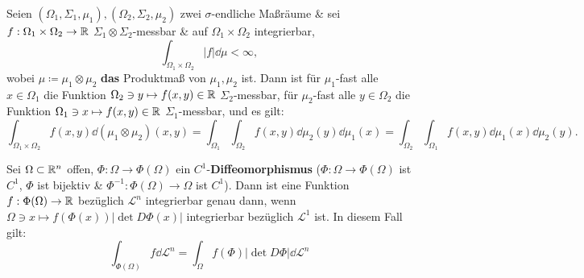 \begin{theorem}[Fubini]
	Seien $ \left( \Omega_1, \Sigma_1, \mu_1 \right) , \left( \Omega_2, \Sigma_2, \mu_2 \right)  $ zwei $ \sigma $-endliche Maßräume \& sei $ f: \Omega_1 \times \Omega_2 \to \mathbb{R}  $ $ \Sigma_1 \otimes \Sigma_2 $-messbar \& auf $ \Omega_1 \times \Omega_2 $ integrierbar,
	\[
		\int _{\Omega_1 \times \Omega_2} \left| f \right| \dd \mu < \infty,
	\]
	wobei $ \mu \coloneqq \mu_1 \otimes \mu_2 $ \textbf{das} Produktmaß von $ \mu_1, \mu_2 $ ist.
	Dann ist für $ \mu_1 $-fast alle $ x \in \Omega_1 $ die Funktion $ \Omega_2 \ni y \mapsto f(x, y) \in \mathbb{R}  $ $ \Sigma_2 $-messbar, für $ \mu_2 $-fast alle $ y \in \Omega_2 $ die Funktion $ \Omega_1 \ni x \mapsto f(x, y) \in \mathbb{R}  $ $ \Sigma_1 $-messbar, und es gilt:
	\[
		\int _{\Omega_1 \times  \Omega_2} f(x, y) \dd \left( \mu_1 \otimes \mu_2 \right) \left( x, y \right) = \int _{\Omega_1} \int _{\Omega_2} f(x, y) \dd \mu_2(y) \dd \mu_1(x) = \int _{\Omega_2} \int _{\Omega_1} f(x, y) \dd\mu_1(x) \dd \mu_2 (y).
	\]
\end{theorem}

\begin{theorem}[Transformationssatz ($ \hat{=} $ Substitutionsregel aus Ana. I)]
	Sei $ \Omega \subset \mathbb{R} ^n $ offen, $ \Phi: \Omega \to \Phi(\Omega) $ ein $ C^1 $-\textbf{Diffeomorphismus} ($ \Phi: \Omega \to \Phi(\Omega) $ ist $ C^1 $, $ \Phi $ ist bijektiv \& $ \Phi^{-1} : \Phi(\Omega) \to \Omega $ ist $ C^1 $).
	Dann ist eine Funktion $ f : \Phi(\Omega) \to \mathbb{R}  $ bezüglich $ \mathcal{L} ^n $ integrierbar genau dann, wenn $ \Omega \ni x \mapsto f (\Phi(x)) \left| \det D \Phi(x) \right|  $ integrierbar bezüglich $ \mathcal{L} ^1 $ ist.
	In diesem Fall gilt:
	\[
		\int _{\Phi(\Omega)}  f \dd \mathcal{L} ^n = \int _{\Omega} f (\Phi) \left| \det D \Phi \right| \dd \mathcal{L} ^n
	\]
\end{theorem}

